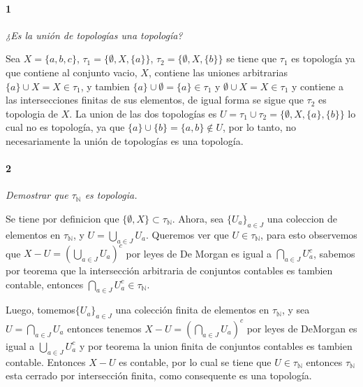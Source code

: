\documentclass[12pt]{article}
\author{Alumnos: \\Arturo Rodriguez Contreras - 2132880 \\
Jonathan Raymundo Torres Cardenas - 1949731\\
Praxedis Jimenes Ruvalcaba \\
Erick Román Montemayor Treviño - 1957959 \\
Alexis Noe Mora Leyva - 1956093\\
Everardo Flores Rivera - 2127301}
\begin{document}
\maketitle

\paragraph{1}
\textit{¿Es la unión de topologías una topología?}

Sea $X = \{ a, b, c \}$, $\tau_{1} = \{\emptyset, X, \{a\} \}$, $ \tau_{2} = \{\emptyset, X, \{b\} \}$
se tiene que $\tau_{1}$ es topología ya que contiene al conjunto vacio, $X$, contiene las uniones arbitrarias
$\{a\} \cup X = X \in \tau_{1}$, y tambien
$\{a\} \cup \emptyset = \{a\} \in \tau_{1}$
y $\emptyset \cup X = X \in \tau_{1}$
y contiene a las intersecciones finitas de sus elementos, 
de igual forma se sigue que $\tau_{2}$ es topologia de $X$. La union de las dos topologías es
$U = \tau_{1} \cup \tau_{2} = \{ \emptyset, X, \{a\}, \{b\} \}$
lo cual no es topolog\'ia, ya que $\{a\} \cup \{b\} = \{a, b\} \notin U$, por lo tanto, no
necesariamente la unión de topologías es una topología.\\

\paragraph{2}
\textit{Demostrar que $\tau_{\mathbb{N}}$ es topologia.}

Se tiene por definicion que $\{\emptyset, X\} \subset \tau_{\mathbb{N}}$. Ahora, sea $\{U_{a}\}_{a \in J}$ una coleccion de elementos en $\tau_{\mathbb{N}}$,
y $U = \bigcup_{a \in J} U_{a}$. Queremos ver que $U \in \tau_{\mathbb{N}}$, para
esto observemos que $X - U = (\bigcup_{a \in J} U_{a})^{c} $ por leyes de De Morgan es igual a
$\bigcap_{a \in J} U_{a}^{c}$, sabemos por teorema que la intersecci\'on arbitraria de conjuntos contables es tambien
contable, entonces $\bigcap_{a \in J} U_{a}^{c} \in \tau_{\mathbb{N}}$. 

Luego, tomemos$\{U_{a}\}_{a \in J}$ una colecci\'on finita de elementos en
$\tau_{\mathbb{N}}$, y sea $U = \bigcap_{a \in J}U_{a}$ entonces tenemos $X - U = (\bigcap_{a \in J}U_{a})^{c}$ por leyes de DeMorgan es igual a $\bigcup_{a \in J}U_{a}^{c}$ y por teorema
la union finita de conjuntos contables es tambien
contable. Entonces $X - U$ es contable, por lo cual se tiene que $U \in \tau_{\mathbb{N}}$ entonces $\tau_{\mathbb{N}}$ esta
cerrado por intersecci\'on finita, como consequente es una topolog\'ia.\\
\end{document}
